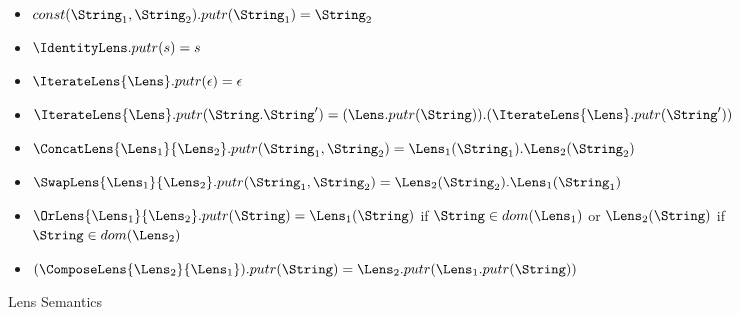 \begin{figure}[b]
\centering
\begin{itemize}
\item $const(\String_1,\String_2).putr(\String_1)=\String_2$
\item $\IdentityLens.putr(s)=s$
\item $\IterateLens{\Lens}.putr(\epsilon) = \epsilon$
\item $\IterateLens{\Lens}.putr(\String . \String') = (\Lens.putr(\String)) . (\IterateLens{\Lens}.putr(\String'))$
\item $\ConcatLens{\Lens_1}{\Lens_2}.putr(\String_1,\String_2) = \Lens_1(\String_1).\Lens_2(\String_2)$
\item $\SwapLens{\Lens_1}{\Lens_2}.putr(\String_1,\String_2) = \Lens_2(\String_2).\Lens_1(\String_1)$
\item $\OrLens{\Lens_1}{\Lens_2}.putr(\String) = \Lens_1(\String)$ if $\String \in dom(\Lens_1)$ or $\Lens_2(\String)$ if $\String \in dom(\Lens_2)$
\item $(\ComposeLens{\Lens_2}{\Lens_1}).putr(\String) = \Lens_2.putr(\Lens_1.putr(\String))$
\end{itemize}
\caption{Lens Semantics}
\label{fig:lens-semantics}
\end{figure}
